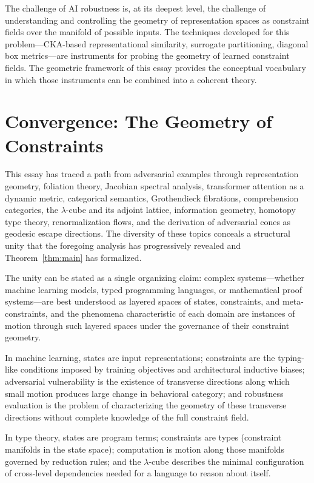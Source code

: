 \documentclass[12pt,a4paper]{article}
\theoremstyle{plain}
\theoremstyle{definition}
\begin{document}
The challenge of AI robustness is, at its deepest level, the challenge of
understanding and controlling the geometry of representation spaces as constraint
fields over the manifold of possible inputs. The techniques developed for this
problem---CKA-based representational similarity, surrogate partitioning, diagonal
box metrics---are instruments for probing the geometry of learned constraint
fields. The geometric framework of this essay provides the conceptual vocabulary
in which those instruments can be combined into a coherent theory.

\section{Convergence: The Geometry of Constraints}
\label{sec:convergence}

This essay has traced a path from adversarial examples through representation
geometry, foliation theory, Jacobian spectral analysis, transformer attention
as a dynamic metric, categorical semantics, Grothendieck fibrations,
comprehension categories, the $\lambda$-cube and its adjoint lattice,
information geometry, homotopy type theory, renormalization flows, and the
derivation of adversarial cones as geodesic escape directions. The diversity
of these topics conceals a structural unity that the foregoing analysis has
progressively revealed and Theorem~\ref{thm:main} has formalized.

The unity can be stated as a single organizing claim: complex systems---whether
machine learning models, typed programming languages, or mathematical proof
systems---are best understood as layered spaces of states, constraints, and
meta-constraints, and the phenomena characteristic of each domain are instances
of motion through such layered spaces under the governance of their constraint
geometry.

In machine learning, states are input representations; constraints are the
typing-like conditions imposed by training objectives and architectural inductive
biases; adversarial vulnerability is the existence of transverse directions along
which small motion produces large change in behavioral category; and robustness
evaluation is the problem of characterizing the geometry of these transverse
directions without complete knowledge of the full constraint field.

In type theory, states are program terms; constraints are types (constraint
manifolds in the state space); computation is motion along those manifolds
governed by reduction rules; and the $\lambda$-cube describes the minimal
configuration of cross-level dependencies needed for a language to reason about
itself.
\end{document}
